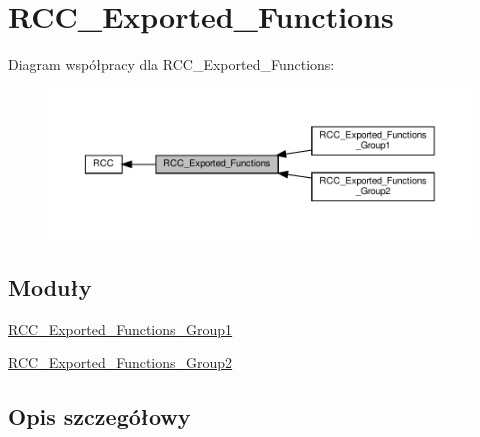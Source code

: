 \hypertarget{group___r_c_c___exported___functions}{}\section{R\+C\+C\+\_\+\+Exported\+\_\+\+Functions}
\label{group___r_c_c___exported___functions}
Diagram współpracy dla R\+C\+C\+\_\+\+Exported\+\_\+\+Functions\+:\nopagebreak
\begin{figure}[H]
\begin{center}
\leavevmode
\includegraphics[width=350pt]{group___r_c_c___exported___functions}
\end{center}
\end{figure}
\subsection*{Moduły}
\begin{DoxyCompactItemize}
\item 
\hyperlink{group___r_c_c___exported___functions___group1}{R\+C\+C\+\_\+\+Exported\+\_\+\+Functions\+\_\+\+Group1}
\item 
\hyperlink{group___r_c_c___exported___functions___group2}{R\+C\+C\+\_\+\+Exported\+\_\+\+Functions\+\_\+\+Group2}
\end{DoxyCompactItemize}


\subsection{Opis szczegółowy}
